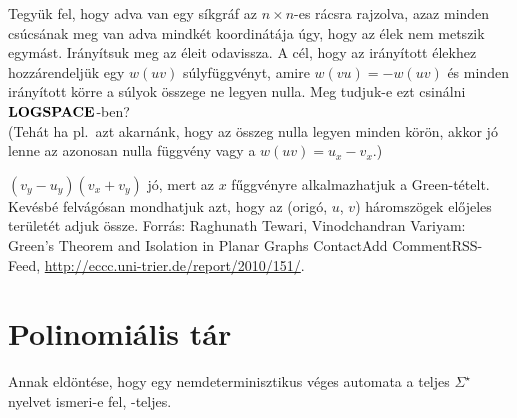 \begin{Exercise}[counter={sorszam}, difficulty=2]
	Tegy\"uk fel, hogy adva van egy s\'ikgr\'af az $n\times n$-es r\'acsra rajzolva, azaz minden cs\'ucs\'anak meg van adva mindk\'et koordin\'at\'aja \'ugy, hogy az \'elek nem metszik egym\'ast. Ir\'any\'itsuk meg az \'eleit odavissza. A c\'el, hogy az ir\'any\'itott \'elekhez hozz\'arendelj\"uk egy $w(uv)$ s\'ulyf\"uggv\'enyt, amire $w(vu)=-w(uv)$ \'es minden ir\'any\'itott k\"orre a s\'ulyok \"osszege ne legyen nulla. Meg tudjuk-e ezt csin\'alni $\mbox{\ensuremath{\mathbf{LOGSPACE}}}$-ben?\\
	(Teh\'at ha pl.\ azt akarn\'ank, hogy az \"osszeg nulla legyen minden k\"or\"on, akkor j\'o lenne az azonosan nulla f\"uggv\'eny vagy a $w(uv)=u_x-v_x$.)
\end{Exercise}	
\begin{Answer}
	$(v_y-u_y)(v_x+v_y)$ j\'o, mert az $x$ f\H uggv\'enyre alkalmazhatjuk a Green-t\'etelt.
	Kev\'esb\'e felv\'ag\'osan mondhatjuk azt, hogy az (orig\'o, $u$, $v$) h\'aromsz\"ogek el\H ojeles ter\"ulet\'et adjuk \"ossze.
	Forr\'as: Raghunath Tewari, Vinodchandran Variyam: Green's Theorem and Isolation in Planar Graphs
	ContactAdd CommentRSS-Feed,
	\url{  http://eccc.uni-trier.de/report/2010/151/}.
\end{Answer}




\section{Polinomiális tár}


\begin{Exercise}[counter={sorszam}, difficulty=1]
	Annak eldöntése, hogy egy nemdeterminisztikus véges automata a teljes $\Sigma ^ \star$ nyelvet
	ismeri-e fel, \PSPACE-teljes. 
\end{Exercise}


